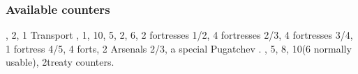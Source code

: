 \subsubsection{Available counters}
\ARMY, 2\FLEET, 1 Transport \FLEET, 1\corsaire,
10\LDND, 5\LD, 2\NTD, 6\LDENDE, 2 fortresses 1/2, 4 fortresses 2/3, 4
fortresses 3/4, 1 fortress 4/5, 4 forts, 2 Arsenals 2/3,
a special Pugatchev \ARMY.
\COL, 5\TP, 8\MNU, 10\TradeFLEET (6 normally
usable), 2\ROTW treaty counters.

